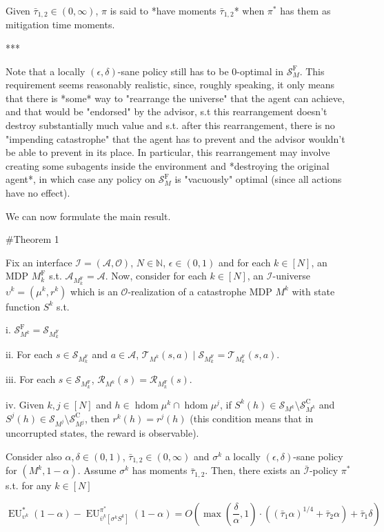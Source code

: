 \documentclass[a4paper]{article}
\newcommand{\AP}[1]{\left(#1\right)}
\newcommand{\AB}[1]{\left[#1\right]}
\newcommand{\Nats}{\mathbb{N}}
\newcommand{\Ob}{\mathcal{O}}
\newcommand{\A}{\mathcal{A}}
\newcommand{\St}{\mathcal{S}}
\newcommand{\T}{\mathcal{T}}
\newcommand{\R}{\mathcal{R}}
\newcommand{\In}{\mathcal{I}}
\newcommand{\Adi}{{\bar{\In}}}
\DeclareMathOperator{\HD}{hdom}
\newcommand{\RMC}{\mathrm{C}}
\newcommand{\RMF}{\mathrm{F}}
\newcommand{\SF}{\St^{\RMF}}
\newcommand{\SC}{\St^{\RMC}}
\newcommand{\MF}{M^{\RMF}}
\newcommand{\EU}{\operatorname{EU}}
\begin{document}
Given $\bar{\tau}_{1,2} \in (0,\infty)$, $\pi$ is said to *have moments $\bar{\tau}_{1,2}$* when $\pi^*$ has them as mitigation time moments.

***

Note that a locally $(\epsilon,\delta)$-sane policy still has to be $0$-optimal in $\SF_M$. This requirement seems reasonably realistic, since, roughly speaking, it only means that there is *some* way to "rearrange the universe" that the agent can achieve, and that would be "endorsed" by the advisor, s.t this rearrangement doesn't destroy substantially much value and s.t. after this rearrangement, there is no "impending catastrophe" that the agent has to prevent and the advisor wouldn't be able to prevent in its place. In particular, this rearrangement may involve creating some subagents inside the environment and *destroying the original agent*, in which case any policy on $\SF_M$ is "vacuously" optimal (since all actions have no effect).

We can now formulate the main result.

\#Theorem 1

Fix an interface $\In=(\A,\Ob)$, $N \in \Nats$, $\epsilon \in (0,1)$ and for each $k \in [N]$, an MDP $\MF_k$ s.t. $\A_{\MF_k} = \A$. Now, consider for each $k \in [N]$, an $\In$-universe $\upsilon^k=(\mu^k,r^k)$ which is an $\Ob$-realization of a catastrophe MDP $M^k$ with state function $S^k$ s.t.

i. $\SF_{M^k} = \St_{\MF_k}$

ii. For each $s \in \St_{\MF_k}$ and $a \in \A$, $\T_{M^k}(s,a) \mid \St_{\MF_k} = \T_{\MF_k}(s,a)$.

iii. For each $s \in \St_{\MF_k}$, $\R_{M^k}(s)=\R_{\MF_k}(s)$.

iv. Given $k,j \in [N]$ and $h \in \HD{\mu^k} \cap \HD{\mu^j}$, if $S^k(h) \in \St_{M^k} \setminus \SC_{M^k}$ and $S^j(h) \in \St_{M^j} \setminus \SC_{M^j}$, then $r^k(h)=r^j(h)$ (this condition means that in uncorrupted states, the reward is observable).

Consider also $\alpha,\delta\in(0,1)$, $\bar{\tau}_{1,2} \in (0,\infty)$ and $\sigma^k$ a locally $(\epsilon,\delta)$-sane policy for $(M^k,1-\alpha)$. Assume $\sigma^k$ has moments $\bar{\tau}_{1,2}$. Then, there exists an $\Adi$-policy $\pi^*$ s.t. for any $k \in [N]$

$$\EU_{\upsilon^k}^*(1-\alpha) - \EU_{\bar{\upsilon}^k\AB{\sigma^kS^k}}^{\pi^*}(1-\alpha) = O\AP{\max\AP{\frac{\delta}{\alpha},1}\cdot\AP{(\bar{\tau}_1 \alpha)^{1/4} + \bar{\tau}_2 \alpha}+\bar{\tau}_1\delta}$$
\end{document}
